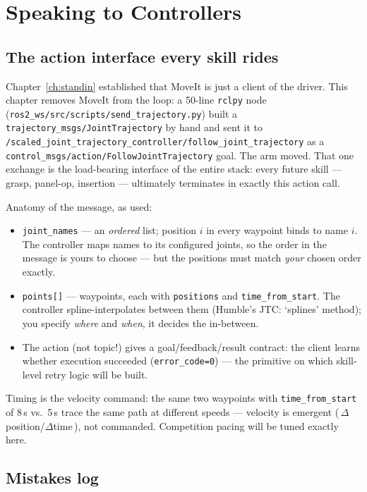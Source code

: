 \chapter{Speaking to Controllers}
\label{ch:controllers}

\section{The action interface every skill rides}

Chapter~\ref{ch:standin} established that MoveIt is just a client of the driver. This chapter
removes MoveIt from the loop: a 50-line \texttt{rclpy} node
(\texttt{ros2\_ws/src/scripts/send\_trajectory.py}) built a
\texttt{trajectory\_msgs/JointTrajectory} by hand and sent it to
\texttt{/scaled\_joint\_trajectory\_controller/follow\_joint\_trajectory} as a
\texttt{control\_msgs/action/FollowJointTrajectory} goal. The arm moved. That one exchange is
the load-bearing interface of the entire stack: every future skill --- grasp, panel-op,
insertion --- ultimately terminates in exactly this action call.

Anatomy of the message, as used:
\begin{itemize}
  \item \texttt{joint\_names} --- an \emph{ordered} list; position $i$ in every waypoint binds
  to name $i$. The controller maps names to its configured joints, so the order in the message
  is yours to choose --- but the positions must match \emph{your} chosen order exactly.
  \item \texttt{points[]} --- waypoints, each with \texttt{positions} and
  \texttt{time\_from\_start}. The controller spline-interpolates between them (Humble's JTC:
  `splines' method); you specify \emph{where} and \emph{when}, it decides the in-between.
  \item The action (not topic!) gives a goal/feedback/result contract: the client learns
  whether execution succeeded (\texttt{error\_code=0}) --- the primitive on which skill-level
  retry logic will be built.
\end{itemize}

Timing is the velocity command: the same two waypoints with \texttt{time\_from\_start} of
8\,s vs.\ 5\,s trace the same path at different speeds --- velocity is emergent
(\,$\Delta$position/$\Delta$time\,), not commanded. Competition pacing will be tuned exactly
here.

\section{Mistakes log}

